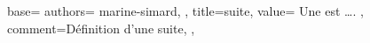{
  base={
    authors={
      marine-simard,
    },
    title=suite,
    value={
      Une  est ….
    },
    comment={Définition d'une suite},
  },
}
